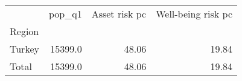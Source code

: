 \begin{tabular}{lrrr}
\toprule
{} &   pop\_q1 &  Asset risk pc &  Well-being risk pc \\
Region &          &                &                     \\
\midrule
Turkey &  15399.0 &          48.06 &               19.84 \\
Total  &  15399.0 &          48.06 &               19.84 \\
\bottomrule
\end{tabular}

